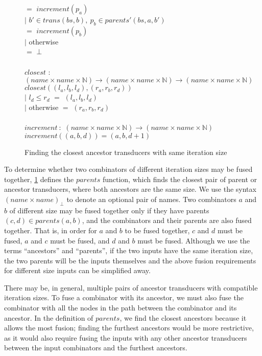 \begin{figure}
\begin{tabbing}
        \>     \>                      \> $=$ \> $increment(p_a)$ \\
        \> $|$ \> $b' \in trans(bs,b),~ p_b \in parents'(bs,a,b')$ \\
        \>     \>                      \> $=$ \> $increment(p_b)$ \\
        \> $|$ \> otherwise            \\
        \>     \>                      \> $=$    \> $\bot$
\\
\\
$closest$ \> $:$ \> $(name \times name \times \mathbb{N}) \to (name \times name \times \mathbb{N}) \to (name \times name \times \mathbb{N})$ \\
$closest((l_a,l_b,l_d), (r_a,r_b,r_d))$ \\
        \> $|$ \> $l_d \le r_d$ \> \> \> $=$ \> $(l_a,l_b,l_d)$ \\
        \> $|$ \> otherwise     \> \> \> $=$ \> $(r_a,r_b,r_d)$ \\
\\
$increment ~ :$ \> \> $(name \times name \times \mathbb{N}) \to (name \times name \times \mathbb{N})$ \\
$increment((a,b,d)) = (a,b,d+1)$ \\
\end{tabbing}

\caption{Finding the closest ancestor transducers with same iteration size}
\label{fig:clustering:parents}
\end{figure}

To determine whether two combinators of different iteration sizes may be fused together, \cref{fig:clustering:parents} defines the $parents$ function, which finds the closest pair of parent or ancestor transducers, where both ancestors are the same size.
We use the syntax $(name \times name)_\bot$ to denote an optional pair of names.
Two combinators $a$ and $b$ of different size may be fused together only if they have parents $(c, d) \in parents(a,b)$, and the combinators and their parents are also fused together.
That is, in order for $a$ and $b$ to be fused together, $c$ and $d$ must be fused, $a$ and $c$ must be fused, and $d$ and $b$ must be fused.
Although we use the terms ``ancestors'' and ``parents'', if the two inputs have the same iteration size, the two parents will be the inputs themselves and the above fusion requirements for different size inputs can be simplified away.

There may be, in general, multiple pairs of ancestor transducers with compatible iteration sizes.
To fuse a combinator with its ancestor, we must also fuse the combinator with all the nodes in the path between the combinator and its ancestor.
In the definition of $parents$, we find the closest ancestors because it allows the most fusion; finding the furthest ancestors would be more restrictive, as it would also require fusing the inputs with any other ancestor transducers between the input combinators and the furthest ancestors.

